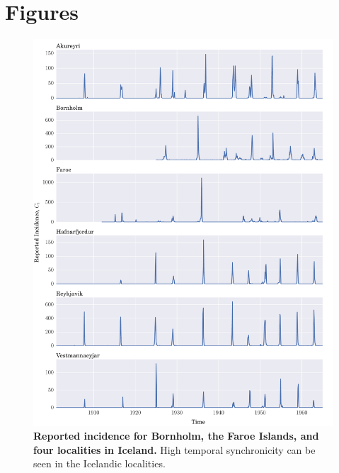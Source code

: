 \documentclass[10pt]{article}
\begin{document}
\section*{Figures}

\begin{figure}[!h]
\centering
\includegraphics[width=\textwidth]{figures/0_incidence.pdf}
\caption{\textbf{Reported incidence for Bornholm, the Faroe Islands, and four localities in Iceland.} High temporal synchronicity can be seen in the Icelandic localities. }
\label{figIncidence}
\end{figure}
\end{document}
